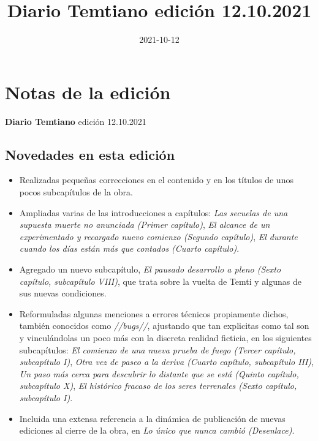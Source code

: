 \documentclass[
  spanish,
]{book}
\title{Diario Temtiano edición 12.10.2021}
\author{}
\date{\vspace{-2.5em}2021-10-12}
\begin{document}
\maketitle

{
\setcounter{tocdepth}{1}
\tableofcontents
}
\hypertarget{notas-de-la-ediciuxf3n}{%
\chapter*{Notas de la edición}\label{notas-de-la-ediciuxf3n}}

\textbf{Diario Temtiano} edición 12.10.2021

\hypertarget{novedades-en-esta-ediciuxf3n}{%
\section*{Novedades en esta edición}\label{novedades-en-esta-ediciuxf3n}}

\begin{itemize}
\item
  Realizadas pequeñas correcciones en el contenido y en los títulos de unos pocos subcapítulos de la obra.
\item
  Ampliadas varias de las introducciones a capítulos: \emph{Las secuelas de una supuesta muerte no anunciada (Primer capítulo)}, \emph{El alcance de un experimentado y recargado nuevo comienzo (Segundo capítulo)}, \emph{El durante cuando los días están más que contados (Cuarto capítulo)}.
\item
  Agregado un nuevo subcapítulo, \emph{El pausado desarrollo a pleno (Sexto capítulo, subcapítulo VIII)}, que trata sobre la vuelta de Temti y algunas de sus nuevas condiciones.
\item
  Reformuladas algunas menciones a errores técnicos propiamente dichos, también conocidos como \emph{//bugs//}, ajustando que tan explicitas como tal son y vinculándolas un poco más con la discreta realidad ficticia, en los siguientes subcapítulos: \emph{El comienzo de una nueva prueba de fuego (Tercer capítulo, subcapítulo I)}, \emph{Otra vez de paseo a la deriva (Cuarto capítulo, subcapítulo III)}, \emph{Un paso más cerca para descubrir lo distante que se está (Quinto capítulo, subcapítulo X)}, \emph{El histórico fracaso de los seres terrenales (Sexto capítulo, subcapítulo I)}.
\item
  Incluida una extensa referencia a la dinámica de publicación de nuevas ediciones al cierre de la obra, en \emph{Lo único que nunca cambió (Desenlace)}.
\end{itemize}
\end{document}
